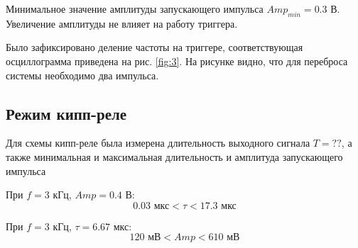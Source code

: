 Минимальное значение амплитуды запускающего импульса $Amp_{ min} = 0.3$ В. Увеличение амплитуды не влияет на работу
триггера.

Было зафиксировано деление частоты на триггере, соответствующая осциллограмма приведена на рис. \ref{fig:3}. На рисунке
видно, что для переброса системы необходимо два импульса. 

\subsection*{Режим кипп-реле}

Для схемы кипп-реле была измерена длительность выходного сигнала $T = ??$, а также минимальная и максимальная
длительность и амплитуда запускающего импульса 

При $f=3$ кГц, $Amp=0.4$ В:
$$0.03\text{ мкс}<\tau<17.3\text{ мкс} $$

При $f=3$ кГц, $\tau = 6.67$ мкс:
$$120\text{ мВ}<Amp<610\text{ мВ} $$


